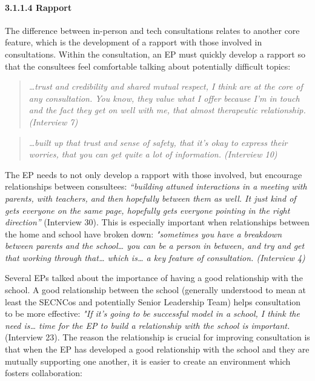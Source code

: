 \documentclass[
  english,
  man]{apa}
\let\oldparagraph\paragraph
\renewcommand{\paragraph}[1]{\oldparagraph{#1}\mbox{}}
\begin{document}
\hypertarget{rapport}{%
\paragraph{3.1.1.4 Rapport}\label{rapport}}

The difference between in-person and tech consultations relates to another core feature, which is the development of a rapport with those involved in consultations. Within the consultation, an EP must quickly develop a rapport so that the consultees feel comfortable talking about potentially difficult topics:

\begin{quote}
\emph{\ldots trust and credibility and shared mutual respect, I think are at the
core of any consultation. You know, they value what I offer because
I'm in touch and the fact they get on well with me, that almost
therapeutic relationship. (Interview 7)}
\end{quote}

\begin{quote}
\emph{\ldots built up that trust and sense of safety, that it's okay to express
their worries, that you can get quite a lot of information. (Interview
10)}
\end{quote}

The EP needs to not only develop a rapport with those involved, but encourage relationships between consultees: \emph{``building attuned interactions in a meeting with parents, with teachers, and then hopefully between them as well. It just kind of gets everyone on the same page, hopefully gets everyone pointing in the right direction''} (Interview 30). This is especially important when relationships between the home and school have broken down: \emph{"sometimes you have a breakdown between parents and the school\ldots{} you can be a person in between, and try and get that working through that\ldots{} which is\ldots{} a key feature of consultation. (Interview 4)}

Several EPs talked about the importance of having a good relationship with the school. A good relationship between the school (generally understood to mean at least the SECNCos and potentially Senior Leadership Team) helps consultation to be more effective: \emph{"If it's going to be successful model in a school, I think the need is\ldots{} time for the EP to build a relationship with the school is important.} (Interview 23). The reason the relationship is crucial for improving consultation is that when the EP has developed a good relationship with the school and they are mutually supporting one another, it is easier to create an environment which fosters collaboration:
\end{document}
